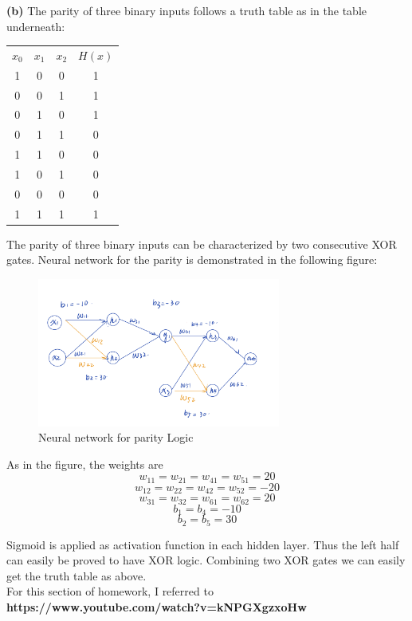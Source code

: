 \documentclass{article}
\begin{document}
\textbf{(b)} The parity of three binary inputs follows a truth table as in the table underneath:
\begin{center}
\begin{tabular}{ c c c c }
 $x_0$ & $x_1$ & $x_2$ & $H(x)$ \\ 
 1 &0 & 0 & 1 \\  
 0 &0 & 1 & 1 \\  
 0 &1 & 0 & 1 \\
 0 &1 & 1& 0  \\
 1&1&0&0\\
 1&0&1&0\\
 0&0&0&0\\
 1&1&1&1\\
\end{tabular}
\end{center}
The parity of three binary inputs can be characterized by two consecutive XOR gates. Neural network for the parity is demonstrated in the following figure:
		\begin{figure}[H]
			\caption{Neural network for parity Logic}
			\centering
			\includegraphics[width=8cm]{1_b.jpeg}
		\end{figure}
As in the figure, the weights are \[w_{11} = w_{21} = w_{41} = w_{51} =20\]
\[w_{12}=w_{22} = w_{42} = w_{52} = -20\]
\[w_{31} = w_{32} = w_{61} = w_{62} = 20\]
\[b_{1} = b_{4} = -10\]
\[b_{2} = b_{5} = 30\]
    
Sigmoid is applied as activation function in each hidden layer. Thus the left half can easily be proved to have XOR logic. Combining two XOR gates we can easily get the truth table as above.
\\For this section of homework, I referred to \textbf{https://www.youtube.com/watch?v=kNPGXgzxoHw}
\end{document}
